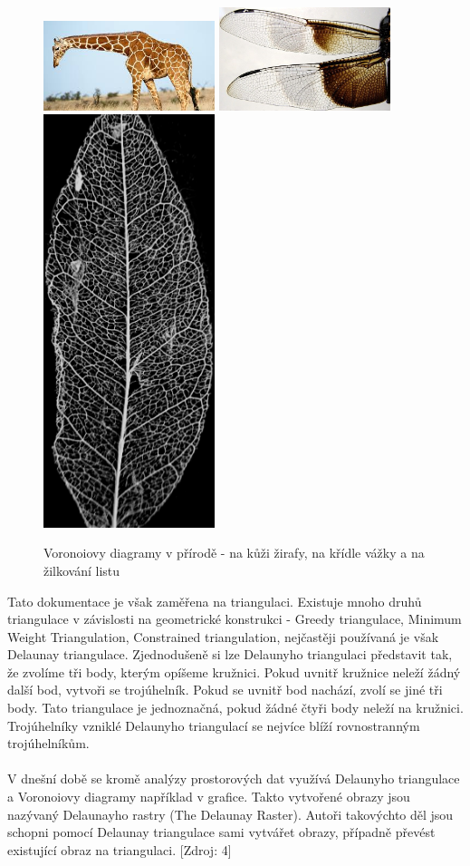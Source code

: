 \documentclass[a4paper, 12pt]{article}
\begin{document}
\begin{figure}[h!]
\centering
\includegraphics[width=5cm]{pictures/zirafa.jpg}
\includegraphics[width=5cm]{pictures/vazka.jpg}
\includegraphics[width=5cm]{pictures/list.jpg}
\caption{Voronoiovy diagramy v přírodě - na kůži žirafy, na křídle vážky a na žilkování listu}
\end{figure}


Tato dokumentace je však zaměřena na triangulaci. Existuje mnoho druhů triangulace v závislosti na geometrické konstrukci - Greedy triangulace, Minimum Weight Triangulation, Constrained triangulation, nejčastěji používaná je však Delaunay triangulace.  Zjednodušeně si lze Delaunyho triangulaci představit tak, že zvolíme tři body, kterým opíšeme kružnici. Pokud uvnitř kružnice neleží žádný další bod, vytvoři se trojúhelník. Pokud se uvnitř bod nachází, zvolí se jiné tři body. Tato triangulace je jednoznačná, pokud žádné čtyři body neleží na kružnici. Trojúhelníky vzniklé Delaunyho triangulací se nejvíce blíží rovnostranným trojúhelníkům. \\
\\
V dnešní době se kromě analýzy prostorových dat využívá Delaunyho triangulace a Voronoiovy diagramy například v grafice. Takto vytvořené obrazy jsou nazývaný Delaunayho rastry (The Delaunay Raster). Autoři takovýchto děl jsou schopni pomocí Delaunay triangulace sami vytvářet obrazy, případně převést existující obraz na triangulaci. [Zdroj: 4]
\end{document}
